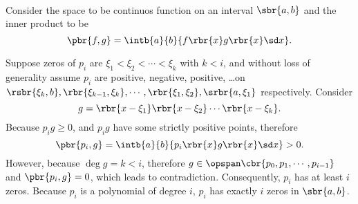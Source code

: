 \documentclass[english, nochinese]{../TeXTemplate/pkupaper}
\begin{document}
\begin{thmquestion}
\
\begin{thmproof}
Consider the space to be continuos function on an interval $ \sbr{ a, b } $ and the inner product to be
\begin{equation}
\pbr{ f, g } = \intb{a}{b}{ f \rbr{x} g \rbr{x} \sd x }.
\end{equation}

Suppose zeros of $p_i$ are $ \xi_1 < \xi_2 < \cdots < \xi_k $ with $ k < i $, and without loss of generality assume $p_i$ are positive, negative, positive, \ldots on $ \rsbr{ \xi_k, b }, \rbr{ \xi_{ k - 1 }, \xi_k }, \cdots, \rbr{ \xi_1, \xi_2 }, \srbr{ a , \xi_1 } $ respectively. Consider
\begin{equation}
g = \rbr{ x - \xi_1 } \rbr{ x - \xi_2 } \cdots \rbr{ x - \xi_k }.
\end{equation}
Because $ p_i g \ge 0 $, and $ p_i g $ have some strictly positive points, therefore
\begin{equation}
\pbr{ p_i, g } = \intb{a}{b}{ p_i \rbr{x} g \rbr{x} \sd x } > 0.
\end{equation}
However, because $ \deg g = k < i $, therefore $ g \in \opspan \cbr{ p_0, p_1, \cdots, p_{ i - 1 } } $ and $ \pbr{ p_i, g } = 0 $, which leads to contradiction. Consequently, $p_i$ has at least $i$ zeros. Because $p_i$ is a polynomial of degree $i$, $p_i$ has exactly $i$ zeros in $ \sbr{ a, b } $.
\end{thmproof}
\end{thmquestion}
\end{document}
